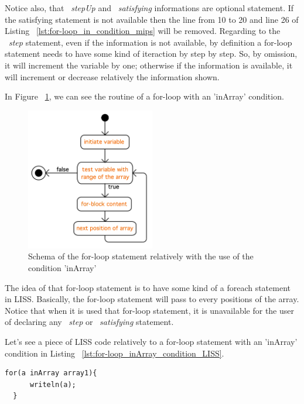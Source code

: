 \documentclass[
  oneside,
  11pt, a4paper,
  footinclude=true,
  headinclude=true,
  cleardoublepage=empty
]{scrbook}
\begin{document}
Notice also, that ~\textit{stepUp} and ~\textit{satisfying} informations are optional statement. If the satisfying statement is not available then the line from 10 to 20 and line 26 of Listing ~\ref{lst:for-loop_in_condition_mips} will be removed. Regarding to the ~\textit{step} statement, even if the information is not available, by definition a for-loop statement needs to  have some kind of iteraction by step by step. So, by omission, it will increment the variable by one; otherwise if the information is available, it will increment or decrease relatively the information shown.

In Figure ~\ref{fig:for-loop_inArray}, we can see the routine of a for-loop with an 'inArray' condition.

\begin{figure}[h!]
  \centering
    \includegraphics[width=0.5\textwidth]{img/for-loop_inArray.png}
    \caption{Schema of the for-loop statement relatively with the use of the condition 'inArray'}
    \label{fig:for-loop_inArray}
\end{figure}

The idea of that for-loop statement is to have some kind of a foreach statement in LISS. Basically, the for-loop statement will pass to every positions of the array. Notice that when it is used that for-loop statement, it is unavailable for the user of declaring any ~\textit{step} or ~\textit{satisfying} statement.

Let's see a piece of LISS code relatively to a for-loop statement with an 'inArray' condition in Listing ~\ref{lst:for-loop_inArray_condition_LISS}.

\begin{lstlisting}[caption={Example of a for-loop statement with 'inArray' condition in LISS},label={lst:for-loop_inArray_condition_LISS}]
  for(a inArray array1){
      writeln(a);
  }
\end{lstlisting}
\end{document}
